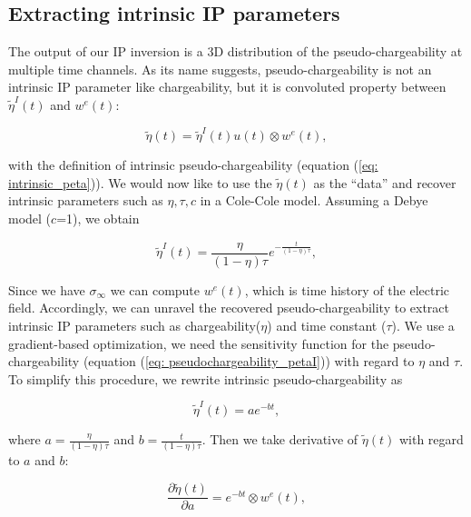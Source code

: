 \documentclass[extra,mreferee]{gji}
\newcommand{\siginf}{\sigma_\infty}
\newcommand{\peta}{\tilde{\eta}}
\begin{document}
\subsection{Extracting intrinsic IP parameters}
\label{section: extract_intrinsicIP}
The output of our IP inversion is a 3D distribution of the pseudo-chargeability at multiple time channels. 
As its name suggests, pseudo-chargeability is not an intrinsic IP parameter like chargeability, but it is convoluted property between $\peta^{I}(t)$ and $w^{e}(t)$:
\begin{linenomath*}
\begin{equation}
  \peta(t) = \peta^{I}(t)u(t) \otimes w^e(t),
  \label{eq: pseudochargeability_petaI}
\end{equation}
\end{linenomath*}
with the definition of intrinsic pseudo-chargeability (equation (\ref{eq: intrinsic_peta})).
We would now like to use the $\peta(t)$ as the “data” and recover intrinsic parameters such as $\eta, \tau, c$ in a Cole-Cole model. Assuming a Debye model ($c$=1), we obtain
\begin{linenomath*}
\begin{equation}
    \peta^{I}(t) = \frac{\eta}{(1-\eta)\tau}e^{-\frac{t}{(1-\eta)\tau}},
    \label{eq: intrinsic_peta_debye}
\end{equation}
\end{linenomath*}
Since we have $\siginf$ we can compute $w^e(t)$, which is time history of the electric field. 
Accordingly, we can unravel the recovered pseudo-chargeability to extract intrinsic IP parameters such as chargeability($\eta$) and time constant ($\tau$). 
We use a gradient-based optimization, we need the sensitivity function for the pseudo-chargeability (equation (\ref{eq: pseudochargeability_petaI})) with regard to $\eta$ and $\tau$. 
To simplify this procedure, we rewrite intrinsic pseudo-chargeability as 
\begin{linenomath*}
\begin{equation}
  \peta^{I}(t) = a e^{-bt},
\end{equation}
\end{linenomath*}
where $a = \frac{\eta}{(1-\eta)\tau}$ and $b = \frac{t}{(1-\eta)\tau}$. 
Then we take derivative of $\peta(t)$ with regard to $a$ and $b$:
\begin{linenomath*}
\begin{equation}
  \frac{\partial \peta(t)}{\partial a} = e^{-bt} \otimes w^e(t),
\end{equation}
\end{linenomath*}
\end{document}
